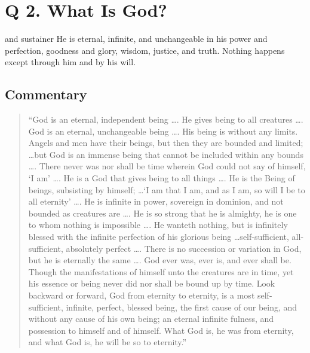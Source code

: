 \documentclass[00-main.tex]{subfiles}
\begin{document}
\section{Q 2. What Is God?}
and sustainer  He is eternal, infinite, and unchangeable in his power and perfection, goodness and glory, wisdom, justice, and truth. Nothing happens except through him and by his will.


\subsection{Commentary}
\begin{quote}
``God is an eternal, independent being \dots. He gives being to all creatures \dots. God is an eternal, unchangeable being \dots. His being is without any limits. Angels and men have their beings, but then they are bounded and limited; \dots but God is an immense being that cannot be included within any bounds \dots. There never was nor shall be time wherein God could not say of himself, `I am' \dots. He is a God that gives being to all things \dots. He is the Being of beings, subsisting by himself; \dots `I am that I am, and as I am, so will I be to all eternity' \dots. He is infinite in power, sovereign in dominion, and not bounded as creatures are \dots. He is so strong that he is almighty, he is one to whom nothing is impossible \dots. He wanteth nothing, but is infinitely blessed with the infinite perfection of his glorious being \dots self-sufficient, all-sufficient, absolutely perfect \dots. There is no succession or variation in God, but he is eternally the same \dots. God ever was, ever is, and ever shall be. Though the manifestations of himself unto the creatures are in time, yet his essence or being never did nor shall be bound up by time. Look backward or forward, God from eternity to eternity, is a most self-sufficient, infinite, perfect, blessed being, the first cause of our being, and without any cause of his own being; an eternal infinite fulness, and possession to himself and of himself. What God is, he was from eternity, and what God is, he will be so to eternity.''
\end{quote}
\end{document}

